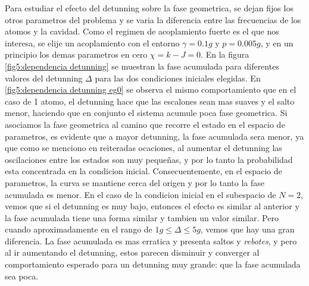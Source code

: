 Para estudiar el efecto del detunning sobre la fase geometrica, se dejan fijos los otros parametros del problema y se varia la diferencia entre las frecuencias de los atomos y la cavidad. Como el regimen de acoplamiento fuerte es el que nos interesa, se elije un acoplamiento con el entorno $\gamma=0.1g$ y $p=0.005g$, y en un principio los demas parametros en cero $\chi=k-J=0$. En la figura \ref{fig5:dependencia detunning} se muestran la fase acumulada para diferentes valores del detunning $\Delta$ para las dos condiciones iniciales elegidas. En \ref{fig5:dependencia detunning eg0} se observa el mismo comportamiento que en el caso de 1 atomo, el detunning hace que las escalones sean mas suaves y el salto menor, haciendo que en conjunto el sistema acumule poca fase geometrica. Si asociamos la fase geometrica al camino que recorre el estado en el espacio de parametros, es evidente que a mayor detunning, la fase acumulada sera menor, ya que como se menciono en reiteradas ocaciones, al aumentar el detunning las oscilaciones entre los estados son muy pequeñas, y por lo tanto la probabilidad esta concentrada en la condicion inicial. Consecuentemente, en el espacio de parametros, la curva se mantiene cerca del origen y por lo tanto la fase acumulada es menor. En el caso de la condicion inicial en el subespacio de $N=2$, vemos que si el detunning es muy bajo, entonces el efecto es similar al anterior y la fase acumulada tiene una forma similar y tambien un valor similar. Pero cuando aproximadamente en el rango de  $1g \leq \Delta \leq 5g$, vemos que hay una gran diferencia. La fase acumulada es mas erratica y presenta saltos y \textit{rebotes}, y pero al ir aumentando el detunning, estos parecen disminuir y converger al comportamiento esperado para un detunning muy grande: que la fase acumulada sea poca.

